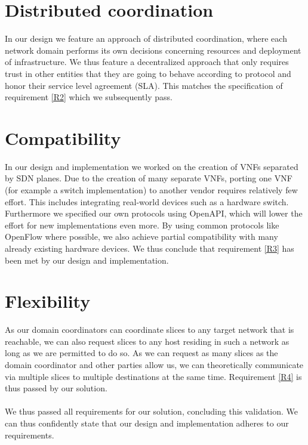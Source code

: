 \section{Distributed coordination}
In our design we feature an approach of distributed coordination, where each network domain performs its own decisions concerning resources and deployment of infrastructure. We thus feature a decentralized approach that only requires trust in other entities that they are going to behave according to protocol and honor their service level agreement (SLA). This matches the specification of requirement \ref{R2} which we subsequently pass.

\section{Compatibility}
In our design and implementation we worked on the creation of VNFs separated by SDN planes. Due to the creation of many separate VNFs, porting one VNF (for example a switch implementation) to another vendor requires relatively few effort. This includes integrating real-world devices such as a hardware switch. Furthermore we specified our own protocols using OpenAPI, which will lower the effort for new implementations even more. By using common protocols like OpenFlow where possible, we also achieve partial compatibility with many already existing hardware devices. We thus conclude that requirement \ref{R3} has been met by our design and implementation.

\section{Flexibility}
As our domain coordinators can coordinate slices to any target network that is reachable, we can also request slices to any host residing in such a network as long as we are permitted to do so. As we can request as many slices as the domain coordinator and other parties allow us, we can theoretically communicate via multiple slices to multiple destinations at the same time. Requirement \ref{R4} is thus passed by our solution.

\paragraph{} We thus passed all requirements for our solution, concluding this validation. We can thus confidently state that our design and implementation adheres to our requirements.
